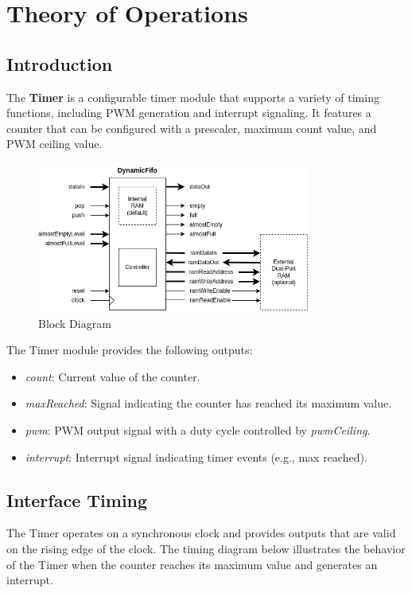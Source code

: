 \section{Theory of Operations}

\subsection{Introduction}
The \textbf{Timer} is a configurable timer module that supports a variety of timing functions, including PWM generation and interrupt signaling. It features a counter that can be configured with a prescaler, maximum count value, and PWM ceiling value.

\begin{figure}[h]
  \includegraphics[width=0.80\textwidth]{images/block-diagram.png}
  \caption{Block Diagram}\label{fig:block-diagram}
\end{figure}

The Timer module provides the following outputs:

\begin{itemize}[noitemsep]
  \item{\textit{count}: Current value of the counter.}
  \item{\textit{maxReached}: Signal indicating the counter has reached its maximum value.}
  \item{\textit{pwm}: PWM output signal with a duty cycle controlled by \textit{pwmCeiling}.}
  \item{\textit{interrupt}: Interrupt signal indicating timer events (e.g., max reached).}
\end{itemize}

\subsection{Interface Timing}
The Timer operates on a synchronous clock and provides outputs that are valid on the rising edge of the clock. The timing diagram below illustrates the behavior of the Timer when the counter reaches its maximum value and generates an interrupt.

